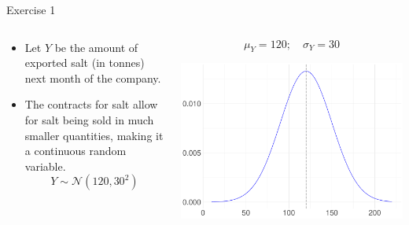 \documentclass[
  11pt,
  ignorenonframetext,
]{beamer}
\providecommand{\tightlist}{%
  \setlength{\itemsep}{0pt}\setlength{\parskip}{0pt}}
\begin{document}
\begin{frame}{Exercise 1}
\protect\hypertarget{exercise-1-2}{}
\begin{columns}[T]
\begin{column}{.7\textwidth}
\begin{itemize}
\tightlist
\item
  Let \(Y\) be the amount of exported salt (in tonnes) next month of the
  company.
\end{itemize}

\vspace{5mm}

\begin{itemize}
\tightlist
\item
  The contracts for salt allow for salt being sold in much smaller
  quantities, making it a continuous random variable. \[
  Y \sim \mathcal{N}(120,30^2)
  \]
\end{itemize}
\end{column}

\begin{column}{0.48\textwidth}
\small

\[
\mu_Y = 120; \quad \sigma_Y = 30
\]

\begin{center}\includegraphics[width=0.8\linewidth]{ECON1013_Tutorial2_files/figure-beamer/unnamed-chunk-4-1} \end{center}
\end{column}
\end{columns}
\end{frame}
\end{document}
